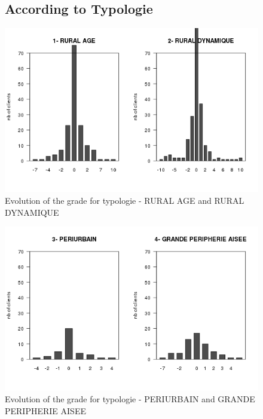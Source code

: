 \documentclass[a4paper, 11pt]{article}
\begin{document}
    \begin{figure}[!ht]
			\subsection{According to Typologie}
            \centering
            \includegraphics[height = 10 cm]{Remi/Evolution_of_the_grade_for_typologie_2-RURAL-DYNAMIQUE.png}
            \caption{Evolution of the grade for typologie - RURAL AGE and RURAL DYNAMIQUE}
            \label{fig:e_typo2}
    \end{figure}

    \begin{figure}[!ht]
            \centering
            \includegraphics[height = 10 cm]{Remi/Evolution_of_the_grade_for_typologie_4-GRANDE-PERIPHERIE-AISEE.png}
            \caption{Evolution of the grade for typologie - PERIURBAIN and GRANDE PERIPHERIE AISEE}
            \label{fig:e_typo4}
    \end{figure}
\end{document}
